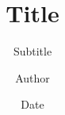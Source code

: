 \documentclass[dvipdfmx]{beamer}
\title[]{Title}
\subtitle{Subtitle}
\author[]{Author}
\institute[]{Institute}
\date{Date}
\begin{document}
\begin{frame}
\titlepage
\end{frame}

\end{document}
